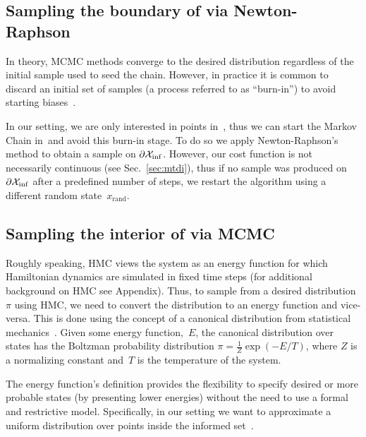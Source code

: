 \documentclass[letterpaper, 10 pt, conference]{ieeeconf}  %
\begin{document}

\subsection{Sampling the boundary of \Cinf via Newton-Raphson}
\label{subsec:grad}
In theory, MCMC methods converge to the desired distribution regardless of the initial sample used to seed the chain.
However, in practice it is common to discard an initial set of samples (a process referred to as ``burn-in'') to avoid starting biases~\cite{ADDJ03}. 

In our setting, we are only interested in points in~\Cinf, thus we can start the Markov Chain in~\Cinf and avoid this burn-in stage. 
To do so we apply  Newton-Raphson's method to obtain a sample on $\partial \mathcal{X}_{\rm {inf}}$. 
However, our cost function is not necessarily continuous (see Sec.~\ref{sec:mtdi}), thus if no sample was produced on $\partial \mathcal{X}_{\rm {inf}}$ after a predefined number of steps, we restart the algorithm using a different random state~$x_\text{rand}$.


\subsection{Sampling the interior of \Cinf via
MCMC}
\label{subsec:mcmc}


	Roughly speaking, HMC views the system as an energy function for which Hamiltonian dynamics are simulated in fixed time steps (for additional background on HMC see Appendix).
	Thus, to sample from a desired distribution~$\pi$ using HMC, we need to convert the distribution to an energy function and vice-versa.
	This is done using the concept of a canonical distribution from statistical mechanics~\cite{N11}. 
	Given some energy function,~$E$, the canonical distribution over states has the Boltzman probability distribution $\pi = \frac{1}{Z}\exp (-E/T)$, where $Z$ is a normalizing constant and~$T$ is the temperature of the system.

The energy function's definition provides the flexibility to specify desired or more probable states (by presenting lower energies) without the need to use a formal and restrictive model. 
Specifically, in our setting we want to approximate 
a uniform distribution over points inside the informed set~\Cinf.
\end{document}
